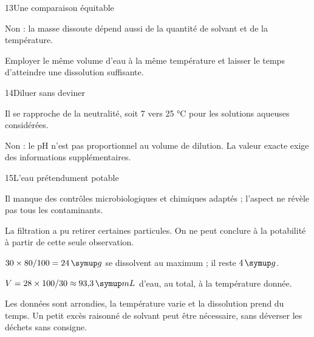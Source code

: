 \par\noindent\begin{minipage}{\linewidth}
\begin{corrige}{13}{Une comparaison équitable}
\begin{questions}
\item Non : la masse dissoute dépend aussi de la quantité de solvant et de la température.
\item Employer le même volume d’eau à la même température et laisser le temps d’atteindre une dissolution suffisante.
\end{questions}
\end{corrige}
\end{minipage}
\par\noindent\begin{minipage}{\linewidth}
\begin{corrige}{14}{Diluer sans deviner}
\begin{questions}
\item Il se rapproche de la neutralité, soit 7 vers 25 °C pour les solutions aqueuses considérées.
\item Non : le pH n’est pas proportionnel au volume de dilution. La valeur exacte exige des informations supplémentaires.
\end{questions}
\end{corrige}
\end{minipage}
\par\noindent\begin{minipage}{\linewidth}
\begin{corrige}{15}{L’eau prétendument potable}
\begin{questions}
\item Il manque des contrôles microbiologiques et chimiques adaptés ; l’aspect ne révèle pas tous les contaminants.
\item La filtration a pu retirer certaines particules. On ne peut conclure à la potabilité à partir de cette seule observation.
\end{questions}
\end{corrige}
\end{minipage}
\par\noindent\begin{minipage}{\linewidth}
\label{cor-defi-4}\begin{questions}
\item $30\times80/100=24\unite g$ se dissolvent au maximum ; il reste $4\unite g$.
\item $V=28\times100/30\approx93{,}3\unite{mL}$ d’eau, au total, à la température donnée.
\item Les données sont arrondies, la température varie et la dissolution prend du temps. Un petit excès raisonné de solvant peut être nécessaire, sans déverser les déchets sans consigne.
\end{questions}
\end{minipage}
